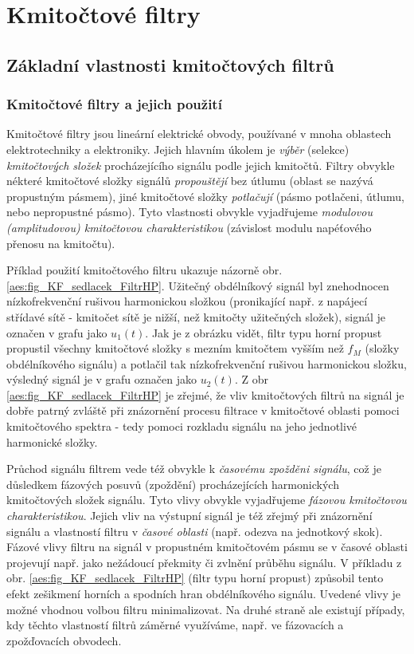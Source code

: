 \chapter{Kmitočtové filtry}
\minitoc
\newpage
  \section{Základní vlastnosti kmitočtových filtrů}
    \subsection{Kmitočtové filtry a jejich použití}
      Kmitočtové filtry jsou lineární elektrické obvody, používané v mnoha oblastech elektrotechniky
      a elektroniky. Jejich hlavním úkolem je \emph{výběr} (selekce) \emph{kmitočtových složek}
      procházejícího signálu podle jejich kmitočtů. Filtry obvykle nékteré kmitočtové složky signálů
      \emph{propouštějí} bez útlumu (oblast se nazývá propustným pásmem), jiné kmitočtové složky
      \emph{potlačují} (pásmo potlačeni, útlumu, nebo nepropustné pásmo). Tyto vlastnosti obvykle
      vyjadřujeme \emph{modulovou (amplitudovou) kmitočtovou charakteristikou} (závislost modulu
      napéťového přenosu na kmitočtu).

      Příklad použití kmitočtového filtru ukazuje názorně obr. \ref{aes:fig_KF_sedlacek_FiltrHP}.
      Užitečný obdélníkový signál byl znehodnocen nízkofrekvenční rušivou harmonickou složkou
      (pronikající např. z napájecí střídavé sítě - kmitočet sítě je nižší, než kmitočty užitečných
      složek), signál je označen v grafu jako \(u_1(t)\). Jak je z obrázku vidět, filtr typu horní
      propust propustil všechny kmitočtové složky s mezním kmitočtem vyšším než \(f_M\) (složky
      obdélníkového signálu) a potlačil tak nízkofrekvenční rušivou harmonickou složku, výsledný
      signál je v grafu označen jako \(u_2(t)\). Z obr \ref{aes:fig_KF_sedlacek_FiltrHP} je zřejmé,
      že vliv kmitočtových filtrů na signál je dobře patrný zvláště při znázornění procesu filtrace
      v kmitočtové oblasti pomoci kmitočtového spektra - tedy pomoci rozkladu signálu na jeho
      jednotlivé harmonické složky.

      Průchod signálu filtrem vede též obvykle k \emph{časovému zpožděni signálu}, což je důsledkem
      fázových posuvů (zpoždění) procházejících harmonických kmitočtových složek signálu. Tyto vlivy
      obvykle vyjadřujeme \emph{fázovou kmitočtovou charakteristikou}. Jejich vliv na výstupní
      signál je též zřejmý při znázornění signálu a vlastností filtru v \emph{časové oblasti} (např.
      odezva na jednotkový skok). Fázové vlivy filtru na signál v propustném kmitočtovém pásmu se v
      časové oblasti projevují např. jako nežádoucí překmity či zvlnění průběhu signálu. V příkladu
      z obr. \ref{aes:fig_KF_sedlacek_FiltrHP} (filtr typu horní propust) způsobil tento efekt
      zešikmení horních a spodních hran obdélníkového signálu. Uvedené vlivy je možné vhodnou
      volbou filtru minimalizovat. Na druhé straně ale existují případy, kdy těchto vlastností
      filtrů záměrné využíváme, např. ve fázovacích a zpožďovacích obvodech.

